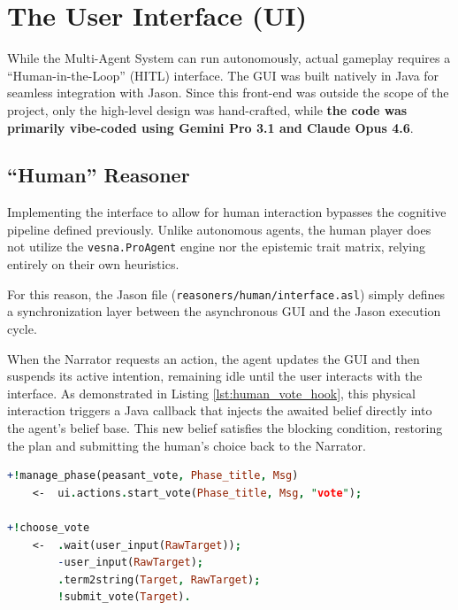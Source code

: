\section{The User Interface (UI)}
\label{sec:ui}

While the Multi-Agent System can run autonomously, actual gameplay requires a ``Human-in-the-Loop'' (HITL) interface. The GUI was built natively in Java for seamless integration with Jason.
Since this front-end was outside the scope of the project, only the high-level design was hand-crafted, while \textbf{the code was primarily vibe-coded using Gemini Pro 3.1 and Claude Opus 4.6}.

\subsection{``Human'' Reasoner}
\label{subsec:human-player}

Implementing the interface to allow for human interaction bypasses the cognitive pipeline defined previously. Unlike autonomous agents, the human player does not utilize the \texttt{vesna.ProAgent} engine nor the epistemic trait matrix, relying entirely on their own heuristics.

For this reason, the Jason file (\texttt{reasoners/human/interface.asl}) simply defines a synchronization layer between the asynchronous GUI and the Jason execution cycle.

When the Narrator requests an action, the agent updates the GUI and then suspends its active intention, remaining idle until the user interacts with the interface. As demonstrated in Listing \ref{lst:human_vote_hook}, this physical interaction triggers a Java callback that injects the awaited belief directly into the agent's belief base. This new belief satisfies the blocking condition, restoring the plan and submitting the human's choice back to the Narrator.

\begin{lstlisting}[frame=single, language=Prolog, caption={Example of a UI execution hook. Once notified the start of the hunting phase the ui is updated to allow the voting; the Agent's intention to choose a target halts using \texttt{.wait} and resumes immediately once the human interaction injects the \texttt{user\_input} belief.}, label={lst:human_vote_hook}]
+!manage_phase(peasant_vote, Phase_title, Msg) 
    <-  ui.actions.start_vote(Phase_title, Msg, "vote");

+!choose_vote
    <-  .wait(user_input(RawTarget)); 
        -user_input(RawTarget); 
        .term2string(Target, RawTarget);
        !submit_vote(Target).
\end{lstlisting}

